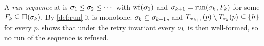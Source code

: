\begin{definition}
\label{def:seq}
A \emph{run sequence} at \Head{} is $\sigma_1 \leq \sigma_2 \leq \cdots$ with
$\mathrm{wf}(\sigma_1)$ and $\sigma_{k+1} = \mathrm{run}(\sigma_k,F_k)$ for some $F_k \subseteq
\Pi(\sigma_k)$. By \cref{def:run} it is monotone: $\sigma_k \subseteq \sigma_{k+1}$,
and $T_{\sigma_{k+1}}(p) \setminus T_{\sigma_k}(p) \subseteq \{h\}$ for
every $p$.  shows that under the retry invariant every $\sigma_k$ is
then well-formed, so no run of the sequence is refused.
\end{definition}
